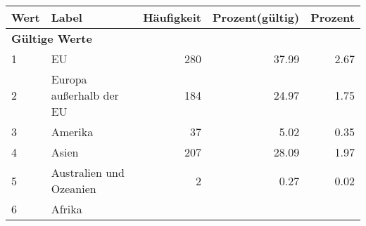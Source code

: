      \begin{longtable}{lXrrr}
     \toprule
     \textbf{Wert} & \textbf{Label} & \textbf{Häufigkeit} & \textbf{Prozent(gültig)} & \textbf{Prozent} \\
     \endhead
     \midrule
     \multicolumn{5}{l}{\textbf{Gültige Werte}}\\

     1 &
     \multicolumn{1}{X}{ EU   } &


       \num{280} &
       \num[round-mode=places,round-precision=2]{37.99} &
         \num[round-mode=places,round-precision=2]{2.67} \\

     2 &
     \multicolumn{1}{X}{ Europa außerhalb der EU   } &


       \num{184} &
       \num[round-mode=places,round-precision=2]{24.97} &
         \num[round-mode=places,round-precision=2]{1.75} \\

     3 &
     \multicolumn{1}{X}{ Amerika   } &


       \num{37} &
       \num[round-mode=places,round-precision=2]{5.02} &
         \num[round-mode=places,round-precision=2]{0.35} \\

     4 &
     \multicolumn{1}{X}{ Asien   } &


       \num{207} &
       \num[round-mode=places,round-precision=2]{28.09} &
         \num[round-mode=places,round-precision=2]{1.97} \\

     5 &
     \multicolumn{1}{X}{ Australien und Ozeanien   } &


       \num{2} &
       \num[round-mode=places,round-precision=2]{0.27} &
         \num[round-mode=places,round-precision=2]{0.02} \\

     6 &
     \multicolumn{1}{X}{ Afrika   } &



\end{longtable}
